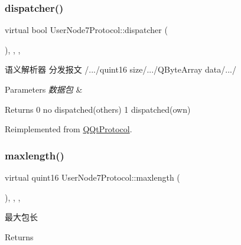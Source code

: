\subsubsection{\texorpdfstring{dispatcher()}{dispatcher()}}
{\footnotesize\ttfamily virtual bool User\+Node7\+Protocol\+::dispatcher (\begin{DoxyParamCaption}\item[{const Q\+Byte\+Array \&}]{ }\end{DoxyParamCaption})\hspace{0.3cm}{\ttfamily [inline]}, {\ttfamily [override]}, {\ttfamily [protected]}, {\ttfamily [virtual]}}



语义解析器 分发报文 /.../quint16 size/.../\+Q\+Byte\+Array data/.../ 


\begin{DoxyParams}{Parameters}
{\em 数据包} & \\
\hline
\end{DoxyParams}
\begin{DoxyReturn}{Returns}
0 no dispatched(others) 1 dispatched(own) 
\end{DoxyReturn}


Reimplemented from \mbox{\hyperlink{class_q_qt_protocol_a35a69c4b89c8cf7459038f40d75e0dc9}{Q\+Qt\+Protocol}}.

\mbox{\label{class_user_node7_protocol_af5dce447ca462ae8815101e33b6476b6}} 
\subsubsection{\texorpdfstring{maxlength()}{maxlength()}}
{\footnotesize\ttfamily virtual quint16 User\+Node7\+Protocol\+::maxlength (\begin{DoxyParamCaption}{ }\end{DoxyParamCaption})\hspace{0.3cm}{\ttfamily [inline]}, {\ttfamily [override]}, {\ttfamily [protected]}, {\ttfamily [virtual]}}



最大包长 

\begin{DoxyReturn}{Returns}

\end{DoxyReturn}


